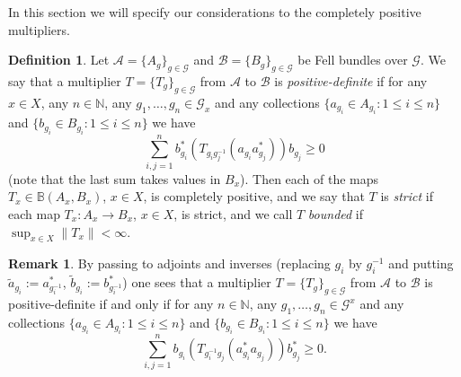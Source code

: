 \documentclass[11 pt, leqno]{amsart}
\numberwithin{equation}{section}
\theoremstyle{plain}
\theoremstyle{definition}
\newtheorem {defn}[thm] {Definition}
\newtheorem {rem} [thm]{Remark}
\newcommand{\Mat}{\mathbb M} %
\renewcommand{\star}{*}
\newcommand{\B}{\mathcal B}
\newcommand{\BB}{\mathbb B}
\newcommand{\G}{\mathcal G} %
\newcommand{\A}{\mathcal A}
\newcommand{\N}{\mathbb N}
\begin{document}
In this section we will specify our considerations to the completely positive multipliers.

\begin{defn}
Let $\A = \{ A_g \}_{g \in \G}$ and $\B = \{ B_g \}_{g \in \G}$ be Fell bundles over $\G$. 
We say that a multiplier $T=\{T_g\}_{g\in \G}$ from $\A$ to $\B$ is \emph{positive-definite} if for any $x \in X$, any $n \in \N$, any $g_1 , \ldots , g_n \in \G_x$ and any collections $\{a_{g_i} \in A_{g_i}: 1 \leq i \leq n \}$ and $\{b_{g_i} \in B_{g_i}: 1 \leq i \leq n \}$ we have
\[
    \sum_{i,j = 1}^n b_{g_i}^{\star} \left( T_{g_i g_j^{-1}} (a_{g_i} a_{g_j}^{\star}) \right) b_{g_j} \geq 0
\]
(note that the last sum takes values in $B_x$).
Then each of the maps $T_x \in \BB(A_{x},B_{x})$, $x \in X$, is completely positive, and we say that $T$ is \emph{strict} if each map $T_x : A_x \to B_x$, $x\in X$, is strict, and we call $T$ \emph{bounded} if $\sup_{x\in X} \| T_x \| < \infty$.
\end{defn}


\begin{rem}\label{rem:equivalent_for_positive_definiteness}
By passing to adjoints and inverses (replacing $g_i$ by $g_i^{-1}$ and putting $\widetilde{a}_{g_i} := a_{g_i^{-1}}^{\star}$, $\widetilde{b}_{g_i} := b_{g_i^{-1}}^{\star}$) one sees that a multiplier $T = \{ T_g \}_{g\in \G}$ from $\A$ to $\B$ is positive-definite if and only if for any $n \in \N$, any $g_1 , \ldots , g_n \in \G^x$ and any collections $\{a_{g_i} \in A_{g_i}: 1 \leq i \leq n \}$ and $\{b_{g_i} \in B_{g_i}: 1 \leq i \leq n \}$ we have  %
\[
    \sum_{i,j = 1}^n b_{g_i} \left( T_{g_i^{-1} g_j} (a_{g_i}^{\star} a_{g_j} ) \right) b_{g_j}^{\star} \geq 0 . %
\]
\end{rem}
\end{document}
